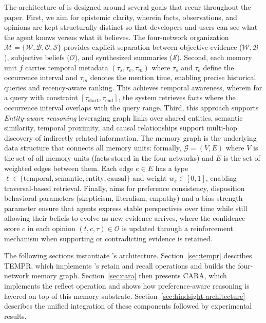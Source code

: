 The architecture of \our is designed around several goals that recur throughout the paper. First, we aim for epistemic clarity, wherein
facts, observations, and opinions are kept structurally distinct so that developers and users can see what the agent knows versus what it believes. The four-network
organization
$\mathcal{M} = \{\mathcal{W}, \mathcal{B}, \mathcal{O}, \mathcal{S}\}$ provides explicit separation between objective evidence ($\mathcal{W}, \mathcal{B}$), subjective beliefs ($\mathcal{O}$), and synthesized summaries ($\mathcal{S}$). 
Second,
each memory unit $f$ carries temporal metadata $(\tau_s, \tau_e, \tau_m)$ where $\tau_s$ and $\tau_e$ define the occurrence interval and $\tau_m$ denotes the mention time, enabling precise historical queries and recency-aware ranking. This achieves
temporal awareness, wherein for a query with constraint $[\tau_{\text{start}}, \tau_{\text{end}}]$, the system retrieves facts where the occurrence interval overlaps with the query range. 
Third, this approach supports {\textit{Entity-aware reasoning}} leveraging graph links over shared entities, semantic similarity, temporal proximity, and causal relationships support multi-hop discovery of indirectly related information. The memory graph is the underlying data structure that connects all memory units: formally, $\mathcal{G} = (V, E)$ where $V$ is the set of all memory units (facts stored in the four networks) and $E$ is the set of weighted edges between them. Each edge $e \in E$ has a type $\ell \in \{\text{temporal}, \text{semantic}, \text{entity}, \text{causal}\}$ and weight $w_e \in [0,1]$, enabling traversal-based retrieval. Finally, \our aims for 
preference consistency, disposition behavioral parameters (skepticism, literalism, empathy) and a bias-strength parameter ensure that agents express stable perspectives over time while still allowing their beliefs to evolve as new evidence arrives, where the confidence score $c$ in each opinion $(t, c, \tau) \in \mathcal{O}$ is updated through a reinforcement mechanism when supporting or contradicting evidence is retained.

The following sections instantiate \our's architecture. Section~\ref{sec:tempr} describes TEMPR, which implements \our's retain and recall operations and builds the four-network memory graph. Section~\ref{sec:cara} then presents CARA, which implements the reflect operation and shows how preference-aware reasoning is layered on top of this memory substrate. Section~\ref{sec:hindsight-architecture} describes the unified integration of these components followed by experimental results.
